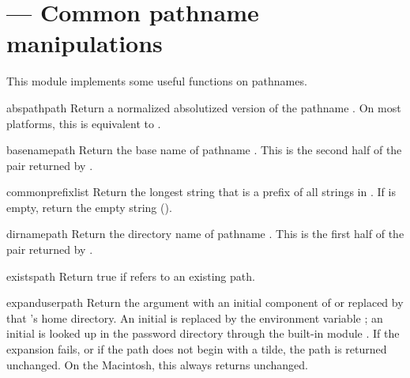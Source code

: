 \section{ ---
         Common pathname manipulations}


This module implements some useful functions on pathnames.


\begin{funcdesc}{abspath}{path}
Return a normalized absolutized version of the pathname .
On most platforms, this is equivalent to
.
\end{funcdesc}

\begin{funcdesc}{basename}{path}
Return the base name of pathname .  This is the second half
of the pair returned by .
\end{funcdesc}

\begin{funcdesc}{commonprefix}{list}
Return the longest string that is a prefix of all strings in
.  If  is empty, return the empty string
().
\end{funcdesc}

\begin{funcdesc}{dirname}{path}
Return the directory name of pathname .  This is the first
half of the pair returned by .
\end{funcdesc}

\begin{funcdesc}{exists}{path}
Return true if  refers to an existing path.
\end{funcdesc}

\begin{funcdesc}{expanduser}{path}
Return the argument with an initial component of \samp{\~} or
 replaced by that 's home directory.  An
initial \samp{\~{}} is replaced by the environment variable
; an initial  is looked up in the
password directory through the built-in module
.  If the expansion fails, or if the
path does not begin with a tilde, the path is returned unchanged.  On
the Macintosh, this always returns  unchanged.
\end{funcdesc}

